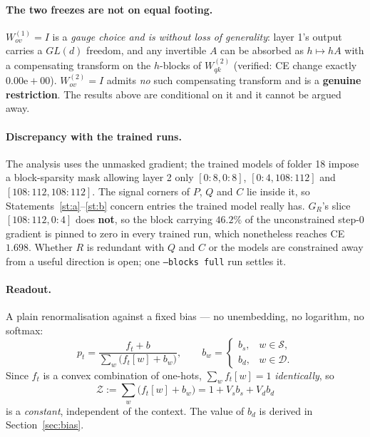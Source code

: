 \documentclass[11pt,a4paper]{article}
\theoremstyle{plain}
\theoremstyle{definition}
\newcommand{\Sig}{\mathcal{S}}
\newcommand{\Dis}{\mathcal{D}}
\newcommand{\1}{\mathbf{1}}
\begin{document}
\paragraph{The two freezes are not on equal footing.}
$W^{(1)}_{ov}=I$ is a \emph{gauge choice and is without loss of generality}: layer 1's output
carries a $GL(d)$ freedom, and any invertible $A$ can be absorbed as $h\mapsto hA$ with a
compensating transform on the $h$-blocks of $W^{(2)}_{qk}$ (verified: CE change exactly
$0.00\mathrm{e}{+}00$). $W^{(2)}_{ov}=I$ admits \emph{no} such compensating transform and is a
\textbf{genuine restriction}. The results above are conditional on it and it cannot be argued
away.

\paragraph{Discrepancy with the trained runs.}
The analysis uses the unmasked gradient; the trained models of folder 18 impose a block-sparsity
mask allowing layer 2 only $[0{:}8,0{:}8]$, $[0{:}4,108{:}112]$ and $[108{:}112,108{:}112]$. The
signal corners of $P$, $Q$ and $C$ lie inside it, so Statements~\ref{st:a}--\ref{st:b} concern
entries the trained model really has. $G_R$'s slice $[108{:}112,0{:}4]$ does \textbf{not}, so the
block carrying $46.2\%$ of the unconstrained step-$0$ gradient is pinned to zero in every trained
run, which nonetheless reaches CE $1.698$. Whether $R$ is redundant with $Q$ and $C$ or the models
are constrained away from a useful direction is open; one \texttt{--blocks full} run settles it.

\paragraph{Readout.}
A plain renormalisation against a fixed bias --- no unembedding, no logarithm, no softmax:
\begin{equation}\label{eq:readout}
p_t=\frac{f_t+b}{\sum_w\bigl(f_t[w]+b_w\bigr)},\qquad
b_w=\begin{cases}b_s,&w\in\Sig,\\ b_d,&w\in\Dis.\end{cases}
\end{equation}
Since $f_t$ is a convex combination of one-hots, $\sum_wf_t[w]=1$ \emph{identically}, so
\begin{equation}
\mathcal{Z}:=\sum_w\bigl(f_t[w]+b_w\bigr)=1+V_sb_s+V_db_d
\end{equation}
is a \emph{constant}, independent of the context. The value of $b_d$ is derived in
Section~\ref{sec:bias}.
\end{document}
